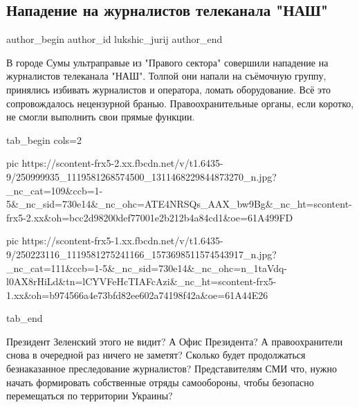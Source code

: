  
 
 
 
 
 
\subsection{Нападение на журналистов телеканала "НАШ"}
\label{sec:30_10_2021.fb.lukshic_jurij.1.napadenie_telekanal_nash}
 
\ifcmt
 author_begin
   author_id lukshic_jurij
 author_end
\fi

В городе Сумы ультраправые из "Правого сектора" совершили нападение на
журналистов телеканала "НАШ". Толпой они напали на съёмочную группу, принялись
избивать журналистов и оператора, ломать оборудование. Всё это сопровождалось
нецензурной бранью. Правоохранительные органы, если коротко, не смогли
выполнить свои прямые функции.

\ifcmt
  tab_begin cols=2

     pic https://scontent-frx5-2.xx.fbcdn.net/v/t1.6435-9/250999935_1119581268574500_1311468229844873270_n.jpg?_nc_cat=109&ccb=1-5&_nc_sid=730e14&_nc_ohc=ATE4NRSQs_AAX_bw9Bg&_nc_ht=scontent-frx5-2.xx&oh=bcc2d98200def77001e2b212b4a84cd1&oe=61A499FD

     pic https://scontent-frx5-1.xx.fbcdn.net/v/t1.6435-9/250223116_1119581275241166_1573698511574543917_n.jpg?_nc_cat=111&ccb=1-5&_nc_sid=730e14&_nc_ohc=n_1taVdq-l0AX8rHiLd&tn=lCYVFeHcTIAFcAzi&_nc_ht=scontent-frx5-1.xx&oh=b974566a4e73bfd82ee602a74198f42a&oe=61A44E26

  tab_end
\fi

Президент Зеленский этого не видит? А Офис Президента? А правоохранители снова
в очередной раз ничего не заметят? Сколько будет продолжаться безнаказанное
преследование журналистов? Представителям СМИ что, нужно начать формировать
собственные отряды самообороны, чтобы безопасно перемещаться по территории
Украины?

